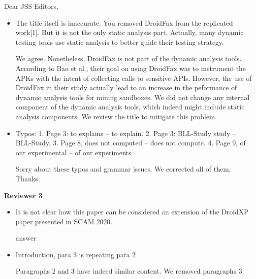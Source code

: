 \documentclass[12pt,english]{scrlttr2}
\begin{document}
\begin{letter}{Dear JSS Editors,}
\begin{itemize}
\item The title itself is inaccurate. You removed DroidFax from the replicated work[1]. But it is not the only static analysis part. 
Actually, many dynamic testing tools use static analysis to better guide their testing strategy.


\vspace{0.2cm}

{\color{blue}{\bf Answer.} We agree. Nonetheless, DroidFax is not part of the dynamic analysis tools. According to Bao et al., their goal on using DroidFax was to instrument the APKs with the intent of collecting calls to sensitive APIs. However, the use of DroidFax in their study actually lead to an increase in the peformance of dynamic analysis tools for mining sandboxes. We did not change any internal component of the dynamic analysis tools, which indeed might include static analysis components. We review the title to mitigate this problem.}

\vspace{0.2cm}

\item Typos:
1. Page 3: to explains -- to explain.
2. Page 3: BLL-Study study -- BLL-Study.
3. Page 8, does not computed -- does not compute.
4. Page 9, of our experimental -- of our experiments.


\vspace{0.2cm}

{\color{blue}{\bf Answer.} Sorry about these typos and grammar issues. We corrected all of them. Thanks.}

\end{itemize}

{\bf Reviewer 3}

\begin{itemize}

\item It is not clear how this paper can be considered an extension of the DroidXP paper presented in SCAM 2020.


\vspace{0.2cm}

{\color{blue}{\bf Answer.} answer}

\vspace{0.2cm}

\item Introduction, para 3 is repeating para 2


\vspace{0.2cm}

{\color{blue}{\bf Answer.} Paragraphs 2 and 3 have indeed similar content. We removed paragraphs 3.}


\end{itemize}
\end{letter}
\end{document}
